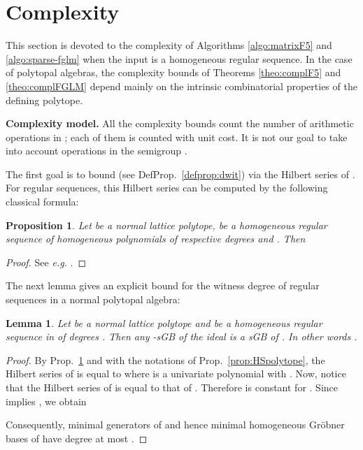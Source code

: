 \documentclass[12pt]{article}
\numberwithin{equation}{section}
\numberwithin{theorem}{section}
\newtheorem{proposition}[theorem]{Proposition}
\newtheorem{lemma}[theorem]{Lemma}
\begin{document}
\section{Complexity}\label{sec:complexity}
This section is devoted to the complexity of Algorithms \ref{algo:matrixF5} and \ref{algo:sparse-fglm} when the input is a homogeneous regular sequence. In the case of polytopal algebras, the complexity bounds of Theorems \ref{theo:complF5} and \ref{theo:complFGLM} depend mainly on the intrinsic combinatorial properties of the defining polytope.

\smallskip

{\bf Complexity model.} All the complexity bounds count
the number of arithmetic operations  in
; each of them is counted with unit cost. It is not our goal to
take into account operations in the semigroup .

\smallskip

The first goal is to bound  (see DefProp.~\ref{defprop:dwit}) via the Hilbert series of . For regular sequences, this Hilbert series can be computed by the following classical formula:
\begin{proposition}\label{prop:HSsuitereg}
Let  be a normal lattice polytope,  be a homogeneous regular sequence of homogeneous polynomials of respective degrees  and . Then 

\end{proposition}
\begin{proof}
See \emph{e.g.} \cite[Exercise 21.17b]{eisenbud1995commutative}.
\end{proof}
The next lemma gives an explicit bound for the witness degree of regular sequences in a normal polytopal algebra:
\begin{lemma}\label{lem:sparsedreg}
  Let  be a normal lattice polytope and  be a homogeneous regular sequence in  of degrees .
Then any -sGB  of the ideal  is a sGB of . In other words .
\end{lemma}

\begin{proof}
By Prop.~\ref{prop:HSsuitereg} and with the notations of Prop.~\ref{prop:HSpolytope}, the
Hilbert series of  is equal to
 where  is a univariate polynomial with
.  Now, notice that
the Hilbert series of  is equal to that of
. Therefore  is
constant for . Since  implies , we obtain


Consequently,
minimal generators of  and hence minimal homogeneous Gr\"obner bases of
 have degree at most . 
\end{proof}
\end{document}
